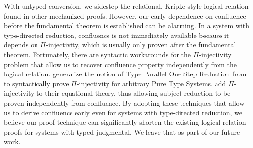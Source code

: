 \documentclass[acmsmall,screen=true,
\ifpublic review=false\else,review=true\fi
  ,anonymous=\ifanonymous true\else false\fi]{acmart}
\newcommand{\scw}[1]{}
\newcommand{\yl}[1]{}
\begin{document}
With untyped conversion,
we sidestep the relational, Kripke-style logical relation found in
other mechanized proofs. \scw{Need to define Kripke-style. Also the other
proofs need Kripke style because they are defining typed relations, not untyped
relations. }
However, our early dependence on confluence
before the fundamental theorem is established can be alarming.
In a system with type-directed reduction,
confluence is not immediately available because it
depends on $\Pi$-injectivity, which is usually only proven after the
fundamental theorem.\scw{confluence depends on Pi injectivity? I thought
it was only needed for subject reduction}\yl{it's
transitive. Confluence depends on subject reduction, which in turn
depends on pi injectivity. Maybe it's worth spelling out the details}
Fortunately, there are syntactic workarounds for the $\Pi$-injectivity
problem that allow us to recover confluence property independently
from the logical relation. \citet{siles2012pure} generalize the
notion of Type Parallel One Step Reduction from \citet{adams2006pure}
to syntactically prove $\Pi$-injectivity for arbitrary Pure Type
Systems. \citet{weirich:systemd} add $\Pi$-injectivity to their
equational theory, thus allowing subject reduction to be proven
independently from confluence. By adopting these techniques that allow
us to derive confluence early even for systems with type-directed
reduction, we believe our proof technique can significantly shorten
the existing logical relation proofs for systems with typed
judgmental. We leave that as part of our future work.
\scw{Not sure that I understand this paragraph}
\yl{Reworded slightly to emphasize it's future work that we haven't
  done and it is speculative}
\end{document}
